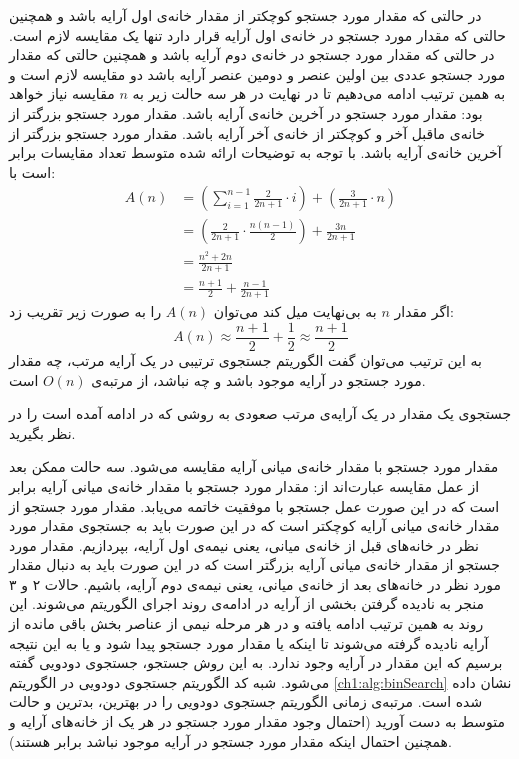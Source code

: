 {در حالتی که مقدار مورد جستجو کوچکتر از مقدار خانه‌ی اول آرایه باشد و همچنین حالتی که مقدار مورد جستجو در خانه‌ی اول آرایه قرار دارد تنها یک مقایسه لازم است. در حالتی که مقدار مورد جستجو در خانه‌ی دوم آرایه باشد و همچنین حالتی که مقدار مورد جستجو عددی بین اولین عنصر و دومین عنصر آرایه باشد دو مقایسه لازم است و به همین ترتیب ادامه می‌دهیم تا در نهایت در هر سه حالت زیر به {$n$} مقایسه نیاز خواهد بود:
 مقدار مورد جستجو در آخرین خانه‌ی آرایه باشد.
 مقدار مورد جستجو بزرگتر از خانه‌ی ماقبل آخر و کوچکتر از خانه‌ی آخر آرایه باشد.
 مقدار مورد جستجو بزرگتر از آخرین خانه‌ی آرایه باشد.
با توجه به توضیحات ارائه شده متوسط تعداد مقایسات برابر است با:
\begin{align*}
A(n)&=\left( \sum_{i=1}^{n-1}{\frac{2}{2n+1} \cdot i} \right) + \left( \frac{3}{2n+1} \cdot n\right)\\
	&=\left({\frac{2}{2n+1}\cdot\frac{n(n-1)}{2}}\right)+\frac{3n}{2n+1}\\
	&=\frac{n^2+2n}{2n+1}\\
	&=\frac{n+1}{2}+\frac{n-1}{2n+1}
\end{align*}
اگر مقدار {$n$} به بی‌نهایت میل کند می‌توان {$A(n)$} را به صورت زیر تقریب زد:
\begin{displaymath}
A(n)\approx\frac{n+1}{2} + \frac{1}{2}\approx\frac{n+1}{2}
\end{displaymath}
به این ترتیب می‌توان گفت الگوریتم جستجوی ترتیبی در یک آرایه مرتب، چه مقدار مورد جستجو در آرایه موجود باشد و چه نباشد، از مرتبه‌ی {$O(n)$} است.

 جستجوی یک مقدار در یک آرایه‌ی مرتب صعودی به روشی که در ادامه آمده است را در نظر بگیرید. 

مقدار مورد جستجو با مقدار خانه‌ی میانی آرایه مقایسه می‌شود. سه حالت ممکن بعد از عمل مقایسه عبارت‌اند از:
 مقدار مورد جستجو با مقدار خانه‌ی میانی آرایه برابر است که در این صورت عمل جستجو با موفقیت خاتمه می‌یابد.
 مقدار مورد جستجو از مقدار خانه‌ی میانی آرایه کوچکتر است که در این صورت باید به جستجوی مقدار مورد نظر در خانه‌های قبل از خانه‌ی میانی، یعنی نیمه‌ی اول آرایه، بپردازیم.
 مقدار مورد جستجو از مقدار خانه‌ی میانی آرایه بزرگتر است که در این صورت باید به دنبال مقدار مورد نظر در خانه‌های بعد از خانه‌ی میانی، یعنی نیمه‌ی دوم آرایه، باشیم. 
حالات ۲ و ۳ منجر به نادیده گرفتن بخشی از آرایه در ادامه‌ی روند اجرای الگوریتم می‌شوند. این روند به همین ترتیب ادامه یافته و در هر مرحله نیمی از عناصر بخش باقی مانده از آرایه نادیده گرفته می‌شوند تا اینکه یا مقدار مورد جستجو پیدا شود و یا به این نتیجه برسیم که این مقدار در آرایه وجود ندارد. به این روش جستجو، جستجوی دودویی گفته می‌شود. شبه کد الگوریتم جستجوی دودویی در الگوریتم {\eqref{ch1:alg:binSearch}} نشان داده شده است. مرتبه‌ی زمانی الگوریتم جستجوی دودویی را در بهترین، بدترین و حالت متوسط به دست آورید (احتمال وجود مقدار مورد جستجو در هر یک از خانه‌های آرایه و همچنین احتمال اینکه مقدار مورد جستجو در آرایه موجود نباشد برابر هستند).

}
